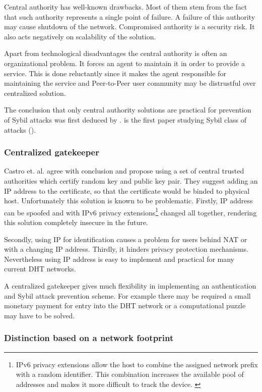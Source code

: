   Central authority has well-known drawbacks. Most of them stem from the fact
  that such authority represents a single point of failure.
  A failure of this authority may cause shutdown of the network.
  Compromised authority is a security risk.
  It also acts negatively on scalability of the solution.
  
  Apart from technological disadvantages the central authority is often an
  organizational problem.
  It forces an agent to maintain it in order to provide a service.
  This is done reluctantly since it makes the agent responsible for maintaining
  the service and Peer-to-Peer user community may be distrustful over
  centralized solution.

  The conclusion that only central authority solutions are practical for
  prevention of Sybil attacks was first deduced by \cite{dou02}.
  \cite{dou02} is the first paper studying Sybil class of attacks
  (\cite{urd11}).

  \subsubsection{Centralized gatekeeper}
  Castro et. al. \cite{cas02} agree with \cite{dou02} conclusion and propose
  using a set of central trusted authorities which certify random key and public
  key pair. They suggest adding an IP address to the certificate, so that the
  certificate would be binded to physical host. Unfortunately this solution is
  known to be problematic. Firstly, IP address can be spoofed and with IPv6
  privacy extensions\footnote{IPv6 privacy extensions allow the host to combine
    the assigned network prefix with a random identifier.
    This combination increases the available pool of addresses and makes it more
    difficult to track the device.  \cite{nar01}}
  changed all together, rendering this solution completely
  insecure in the future.
  
  Secondly, using IP for identification causes a problem for users behind NAT or
  with a changing IP address.
  Thirdly, it hinders privacy protection mechanisms.
  Nevertheless using IP address is easy to implement and practical for many
  current DHT networks.

  A centralized gatekeeper gives much flexibility in implementing an
  authentication and Sybil attack prevention scheme. For example there may be
  required a small monetary payment for entry into the DHT network or a
  computational puzzle may have to be solved.

  \subsubsection{Distinction based on a network footprint}

